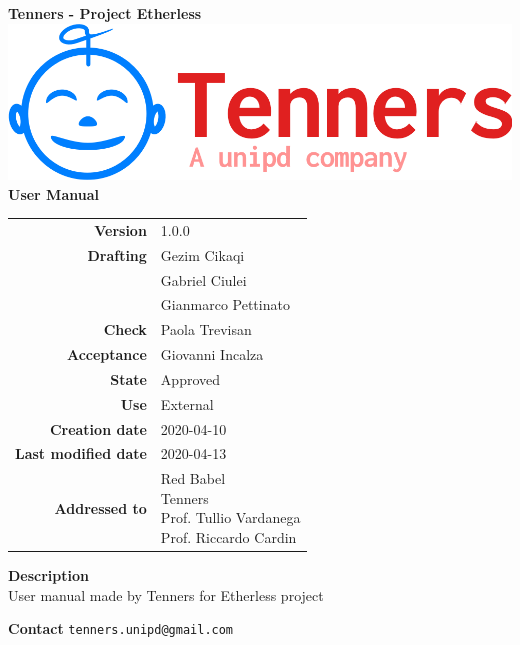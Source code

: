 \begin{titlepage}
	\begin{center}
		\large \textbf{Tenners - Project Etherless}
		\vfill
		\includegraphics[scale = 0.3]{./res/img/logo.png}\\
		\vfill
		\Huge \textbf{User Manual}

        \vfill
        \large

        \begin{tabular}{r|l}
                        \textbf{Version} & 1.0.0 \\
                        \textbf{Drafting} &
                        Gezim Cikaqi\\&
                        Gabriel Ciulei\\&
						Gianmarco Pettinato\\
                        \textbf{Check} &
                        Paola Trevisan\\
                        \textbf{Acceptance} &
                        Giovanni Incalza\\
                        \textbf{State} & Approved \\
                        \textbf{Use} & External\\
                        \textbf{Creation date} &  2020-04-10\\
                        \textbf{Last modified date} &  2020-04-13\\
                        \textbf{Addressed to} & \parbox[t]{5cm}{Red Babel \\Tenners \\Prof. Tullio Vardanega \\Prof. Riccardo Cardin
                        							}
                \end{tabular}
                \vfill
                \normalsize
                \vfill
                                \textbf{Description}
                \\User manual made by Tenners for Etherless project
                \vfill
                \normalsize
                \vfill
                
                \textbf{Contact}
                \texttt{tenners.unipd@gmail.com}

	\end{center}
\end{titlepage}
